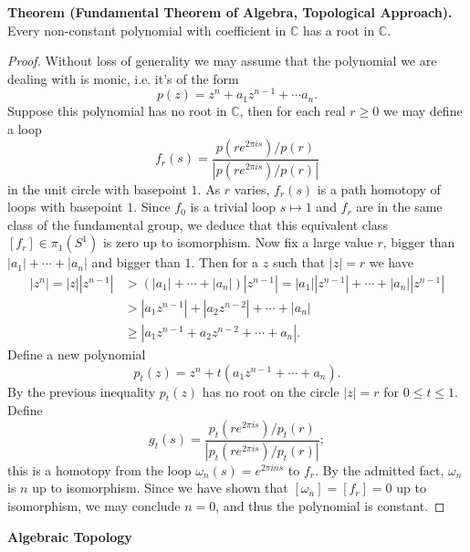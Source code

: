 \documentclass[10pt]{article}
\begin{document}
\begin{CJK*}{UTF8}{gbsn}
\textbf{Theorem (Fundamental Theorem of Algebra, Topological Approach).} Every non-constant polynomial with coefficient in $\mathbb{C}$ has a root in $\mathbb{C}$.
\begin{proof}
Without loss of generality we may assume that the polynomial we are dealing with is monic, i.e. it's of the form $$p(z)=z^n+a_1z^{n-1}+\cdots a_n.$$ Suppose this polynomial has no root in $\mathbb{C}$, then for each real $r\geq0$ we may define a loop $$f_{r}(s)=\frac{p\left(r e^{2 \pi i s}\right) / p(r)}{\left|p\left(r e^{2 \pi i s}\right) / p(r)\right|}$$ in the unit circle with basepoint $1$. As $r$ varies, $f_r(s)$ is a path homotopy of loops with basepoint $1$. Since $f_0$ is a trivial loop $s\mapsto1$ and $f_r$ are in the same class of the fundamental group, we deduce that this equivalent class $[f_r]\in\pi_1(S^1)$ is zero up to isomorphism. Now fix a large value $r$, bigger than $|a_1|+\cdots+|a_n|$ and bigger than $1$. Then for a $z$ such that $|z|=r$ we have \begin{align*}|z^n|=|z||z^{n-1}|&>(|a_1|+\cdots+|a_n|)|z^{n-1}|=|a_1||z^{n-1}|+\cdots+|a_n||z^{n-1}|\\&>|a_1z^{n-1}|+|a_2z^{n-2}|+\cdots+|a_n|\\&\geq|a_1z^{n-1}+a_2z^{n-2}+\cdots+a_n|.\end{align*} Define a new polynomial $$p_t(z)=z^n+t(a_1z^{n-1}+\cdots+a_n).$$ By the previous inequality $p_t(z)$ has no root on the circle $|z|=r$ for $0\leq t\leq 1$. Define $$g_t(s)=\frac{p_t\left(r e^{2 \pi i s}\right) / p_t(r)}{\left|p_t\left(r e^{2 \pi i s}\right) / p_t(r)\right|};$$ this is a homotopy from the loop $\omega_n(s)=e^{2\pi ins}$ to $f_r$. By the admitted fact, $\omega_n$ is $n$ up to isomorphism. Since we have shown that $[\omega_n]=[f_r]=0$ up to isomorphism, we may conclude $n=0$, and thus the polynomial is constant.
\end{proof}

\newpage
\textbf{Algebraic Topology}


\end{CJK*}
\end{document}
